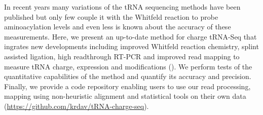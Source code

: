 \documentclass[9pt,lineno]{elife}
\begin{document}
In recent years many variations of the tRNA sequencing methods have been published \citep{Wang2021-fc, Zheng2015-kj, Shigematsu2017-tv, Erber2020-qg, Thomas2021-fi, Lucas2023-vm, Pinkard2020-yd, Warren2021-wt, Yamagami2022-yb} but only few couple it with the Whitfeld reaction to probe aminoacylation levels \citep{Evans2017-st, Behrens2021-gb, Watkins2022-er} and even less is known about the accuracy of these measurements.
Here, we present an up-to-date method for charge tRNA-Seq that ingrates new developments including improved Whitfeld reaction chemistry, splint assisted ligation, high readthrough RT-PCR and improved read mapping to measure tRNA charge, expression and modifications ().
We perform tests of the quantitative capabilities of the method and quantify its accuracy and precision.
Finally, we provide a code repository enabling users to use our read processing, mapping using non-heuristic alignment and statistical tools on their own data (\url{https://github.com/krdav/tRNA-charge-seq}).
\end{document}
